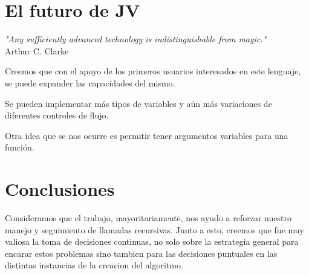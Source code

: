 \documentclass{article}
\begin{document}
\section{El futuro de JV}
\begin{center}
\par\textit{"Any sufficiently advanced technology is indistinguishable from magic."}\\Arthur C. Clarke\\
\end{center}
\par Creemos que con el apoyo de los primeros usuarios interesados en este lenguaje, se puede expander las capacidades del mismo. 
\par Se pueden implementar más tipos de variables y aún más variaciones de diferentes controles de flujo. 
\par Otra idea que se nos ocurre es permitir tener argumentos variables para una función.



\section{Conclusiones}
\par Consideramos que el trabajo, mayoritariamente, nos ayudo a reforzar nuestro manejo y seguimiento de llamadas recursivas. Junto a esto, creemos que fue muy valiosa la toma de decisiones continuas, no solo sobre la estrategia general para encarar estos problemas sino tambien para las decisiones puntuales en las distintas instancias de la creacion del algoritmo.\\
\end{document}
